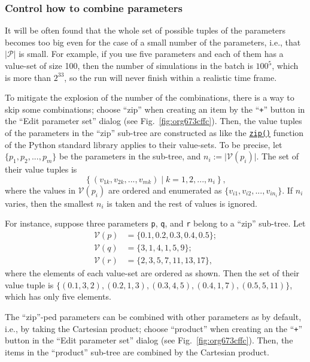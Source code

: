 \documentclass[a4paper,10pt]{report}
\begin{document}
\subsubsection{\label{org3111fd7}Control how to combine parameters}
\label{sec:orgeb9201d}
It will be often found that the whole set of possible tuples of the parameters
becomes too big even for the case of a small number of the parameters, i.e., that
\(\lvert \mathcal{P} \rvert\) is small. For example, if you use five parameters
and each of them has a value-set of size 100, then the number of simulations
in the batch is \(100^5\), which is more than \(2^{33}\), so the run will never finish
within a realistic time frame.

To mitigate the explosion of the number of the combinations, there is a way
to skip some combinations; choose ``zip'' when creating an item by the
``\texttt{+}'' button in the ``Edit parameter set'' dialog
(see Fig.~\ref{fig:org673cffc}).
Then, the value tuples of the parameters in the ``zip'' sub-tree are constructed
as like the \href{https://docs.python.org/3/library/functions.html\#zip}{\texttt{zip()}} function of the Python standard library applies to their value-sets.
To be precise, let \(\{p_1, p_2, ..., p_m\}\) be the parameters in the sub-tree,
and \(n_i := \lvert \mathcal{V}(p_i) \rvert\).
The set of their value tuples is
\[
\left\{(v_{1 k}, v_{2 k}, ..., v_{m k}) \mid k = 1, 2, ..., n_i \right\},
\]
where the values in \(\mathcal{V}(p_i)\) are ordered and enumerated as
\(\{v_{i 1}, v_{i 2}, ..., v_{i n_i} \}\).
If \(n_i\) varies, then the smallest \(n_i\) is taken and the rest of values is
ignored.

For instance, suppose three parameters \texttt{p}, \texttt{q}, and \texttt{r} belong
to a ``zip'' sub-tree. Let
\begin{align}
\mathcal{V}(p) &= \{0.1, 0.2, 0.3, 0.4, 0.5\};\nonumber\\
\mathcal{V}(q) &= \{3, 1, 4, 1, 5, 9\};\nonumber\\
\mathcal{V}(r) &= \{2, 3, 5, 7, 11, 13, 17\},\nonumber
\end{align}
where the elements of each value-set are ordered as shown.
Then the set of their value tuple is \(\{(0.1, 3, 2), (0.2, 1, 3), (0.3, 4, 5),
(0.4, 1, 7), (0.5, 5, 11)\}\), which has only five elements.

The ``zip''-ped parameters can be combined with other parameters as by default,
i.e., by taking the Cartesian product; choose ``product'' when creating an
the ``\texttt{+}'' button in the ``Edit parameter set'' dialog
(see Fig.~\ref{fig:org673cffc}).
Then, the items in the ``product'' sub-tree are combined by the Cartesian
product.
\end{document}
